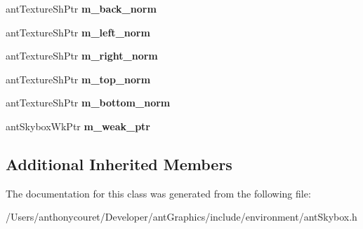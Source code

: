 \begin{DoxyCompactItemize}
\item 
\hypertarget{classant_skybox_ab97c9db7a5daf60c779baf0a4830edc4}{ant\+Texture\+Sh\+Ptr {\bfseries m\+\_\+back\+\_\+norm}}\label{classant_skybox_ab97c9db7a5daf60c779baf0a4830edc4}

\item 
\hypertarget{classant_skybox_af8595eaa31f3499bf47b8774284d159a}{ant\+Texture\+Sh\+Ptr {\bfseries m\+\_\+left\+\_\+norm}}\label{classant_skybox_af8595eaa31f3499bf47b8774284d159a}

\item 
\hypertarget{classant_skybox_a98189f97cf4f29dc995cfc3cad81cc76}{ant\+Texture\+Sh\+Ptr {\bfseries m\+\_\+right\+\_\+norm}}\label{classant_skybox_a98189f97cf4f29dc995cfc3cad81cc76}

\item 
\hypertarget{classant_skybox_a19b09c73314d82158fafdc5f495ffb1c}{ant\+Texture\+Sh\+Ptr {\bfseries m\+\_\+top\+\_\+norm}}\label{classant_skybox_a19b09c73314d82158fafdc5f495ffb1c}

\item 
\hypertarget{classant_skybox_afe29da29d8b0b8c07771e5afc8116b08}{ant\+Texture\+Sh\+Ptr {\bfseries m\+\_\+bottom\+\_\+norm}}\label{classant_skybox_afe29da29d8b0b8c07771e5afc8116b08}

\item 
\hypertarget{classant_skybox_adafe8d00285291c51861c4309502a8a9}{ant\+Skybox\+Wk\+Ptr {\bfseries m\+\_\+weak\+\_\+ptr}}\label{classant_skybox_adafe8d00285291c51861c4309502a8a9}

\end{DoxyCompactItemize}
\subsection*{Additional Inherited Members}


The documentation for this class was generated from the following file\+:\begin{DoxyCompactItemize}
\item 
/\+Users/anthonycouret/\+Developer/ant\+Graphics/include/environment/ant\+Skybox.\+h\end{DoxyCompactItemize}
